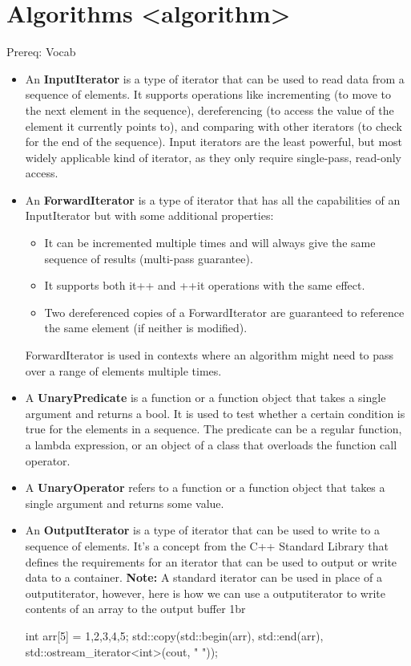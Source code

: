 \documentclass{report}
\begin{document}
    \pagebreak \bigbreak \noindent 
    \section{\LARGE Algorithms <algorithm> }
    \bigbreak \noindent 
    Prereq: Vocab
    \begin{itemize}
        \item An \textbf{InputIterator} is a type of iterator that can be used to read data from a sequence of elements. It supports operations like incrementing (to move to the next element in the sequence), dereferencing (to access the value of the element it currently points to), and comparing with other iterators (to check for the end of the sequence). Input iterators are the least powerful, but most widely applicable kind of iterator, as they only require single-pass, read-only access.
        \item An \textbf{ForwardIterator} is a type of iterator that has all the capabilities of an InputIterator but with some additional properties:
            \begin{itemize}
                \item It can be incremented multiple times and will always give the same sequence of results (multi-pass guarantee).
                \item It supports both it++ and ++it operations with the same effect.
                \item Two dereferenced copies of a ForwardIterator are guaranteed to reference the same element (if neither is modified).
            \end{itemize}
            ForwardIterator is used in contexts where an algorithm might need to pass over a range of elements multiple times.
        \item A \textbf{UnaryPredicate} is a function or a function object that takes a single argument and returns a bool. It is used to test whether a certain condition is true for the elements in a sequence. The predicate can be a regular function, a lambda expression, or an object of a class that overloads the function call operator.
        \item A \textbf{UnaryOperator} refers to a function or a function object that takes a single argument and returns some value.
        \item An \textbf{OutputIterator} is a type of iterator that can be used to write to a sequence of elements. It's a concept from the C++ Standard Library that defines the requirements for an iterator that can be used to output or write data to a container. 
            \bigbreak \noindent 
            \textbf{Note:} A standard iterator can be used in place of a outputiterator, however, here is how we can use a outputiterator to write contents of an array to the output buffer
            1br
            \begin{cppcode}
                int arr[5] = {1,2,3,4,5};
                std::copy(std::begin(arr), std::end(arr), std::ostream_iterator<int>(cout, " "));
            \end{cppcode}
    \end{itemize}
\end{document}
